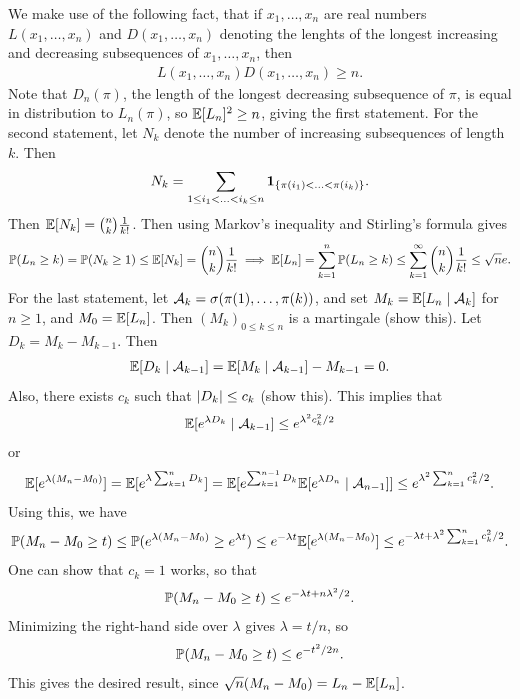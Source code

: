 \noindent We make use of the following fact, that if $x_{1},\ldots,x_{n}$ are real numbers $L(x_{1},\ldots,x_{n})$ and $D(x_{1},\ldots,x_{n})$ denoting the lenghts of the longest increasing and decreasing subsequences of $x_{1},\ldots,x_{n}$, then
\begin{align}
    L(x_{1},\ldots,x_{n})D(x_{1},\ldots,x_{n}) \geq n.
\end{align}
Note that $D_{n}(\pi)$, the length of the longest decreasing subsequence of $\pi$, is equal in distribution to $L_{n}(\pi)$, so $\mathbb{E}[L_{n}]^{2} \geq n$, giving the first statement. For the second statement, let $N_{k}$ denote the number of increasing subsequences of length $k$. Then
\begin{align}
    N_{k} = \sum_{1 \leq i_{1} < \ldots < i_{k} \leq n} \textbf{1}_{\{\pi(i_{1}) < \ldots < \pi(i_{k})\}}.
\end{align}
Then $\mathbb{E}[N_{k}] = \binom{n}{k}\frac{1}{k!}$. Then using Markov's inequality and Stirling's formula gives
\begin{align}
    \mathbb{P}(L_{n} \geq k) = \mathbb{P}(N_{k} \geq 1) \leq \mathbb{E}[N_{k}] = \binom{n}{k} \frac{1}{k!} \implies \mathbb{E}[L_{n}] = \sum_{k=1}^{n} \mathbb{P}(L_{n} \geq k) \leq \sum_{k=1}^{\infty} \binom{n}{k} \frac{1}{k!} \leq \sqrt{n}e.
\end{align}
For the last statement, let $\mathcal{A}_{k} = \sigma(\pi(1),\ldots,\pi(k))$, and set $M_{k} = \mathbb{E}[L_{n} \mid \mathcal{A}_{k}]$ for $n \geq 1$, and $M_{0} = \mathbb{E}[L_{n}]$. Then $(M_{k})_{0 \leq k \leq n}$ is a martingale (show this). Let $D_{k} = M_{k}-M_{k-1}$. Then
\begin{align}
    \mathbb{E}[D_{k} \mid \mathcal{A}_{k-1}] = \mathbb{E}[M_{k} \mid \mathcal{A}_{k-1}] - M_{k-1} = 0.
\end{align}
Also, there exists $c_{k}$ such that $\left| D_{k} \right| \leq c_{k}$ (show this). This implies that
\begin{align}
    \mathbb{E}[e^{\lambda D_{k}} \mid \mathcal{A}_{k-1}] \leq e^{\lambda^{2}c_{k}^{2}/2}
\end{align}
or
\begin{align}
    \mathbb{E}[e^{\lambda (M_{n}-M_{0})}] = \mathbb{E}[e^{\lambda \sum_{k=1}^{n} D_{k}}] = \mathbb{E}[e^{\sum_{k=1}^{n-1} D_{k}} \mathbb{E}[e^{\lambda D_{n}} \mid \mathcal{A}_{n-1}]] \leq e^{\lambda^{2}\sum_{k=1}^{n} c_{k}^{2}/2}.
\end{align}
Using this, we have
\begin{align}
    \mathbb{P}(M_{n}-M_{0} \geq t) \leq \mathbb{P}(e^{\lambda(M_{n}-M_{0})} \geq e^{\lambda t}) \leq e^{-\lambda t} \mathbb{E}[e^{\lambda(M_{n}-M_{0})}] \leq e^{-\lambda t + \lambda^{2}\sum_{k=1}^{n} c_{k}^{2}/2}.
\end{align}
One can show that $c_{k} = 1$ works, so that
\begin{align}
    \mathbb{P}(M_{n}-M_{0} \geq t) \leq e^{-\lambda t + n\lambda^{2}/2}.
\end{align}
Minimizing the right-hand side over $\lambda$ gives $\lambda = t/n$, so
\begin{align}
    \mathbb{P}(M_{n}-M_{0} \geq t) \leq e^{-t^{2}/2n}.
\end{align}
This gives the desired result, since $\sqrt{n}(M_{n}-M_{0}) = L_{n}-\mathbb{E}[L_{n}]$.
\\

